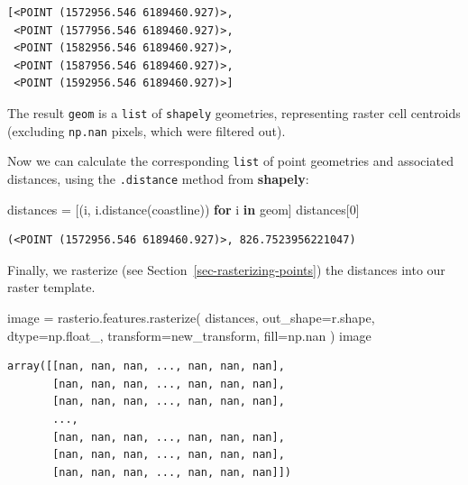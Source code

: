 \documentclass[
  letterpaper,
]{krantz}
\newenvironment{Shaded}{\begin{snugshade}}{\end{snugshade}}
\newcommand{\ControlFlowTok}[1]{\textcolor[rgb]{0.00,0.23,0.31}{\textbf{#1}}}
\newcommand{\DecValTok}[1]{\textcolor[rgb]{0.68,0.00,0.00}{#1}}
\newcommand{\KeywordTok}[1]{\textcolor[rgb]{0.00,0.23,0.31}{\textbf{#1}}}
\newcommand{\NormalTok}[1]{\textcolor[rgb]{0.00,0.23,0.31}{#1}}
\newcommand{\OperatorTok}[1]{\textcolor[rgb]{0.37,0.37,0.37}{#1}}
\begin{document}
\begin{verbatim}
[<POINT (1572956.546 6189460.927)>,
 <POINT (1577956.546 6189460.927)>,
 <POINT (1582956.546 6189460.927)>,
 <POINT (1587956.546 6189460.927)>,
 <POINT (1592956.546 6189460.927)>]
\end{verbatim}

The result \texttt{geom} is a \texttt{list} of \texttt{shapely}
geometries, representing raster cell centroids (excluding
\texttt{np.nan} pixels, which were filtered out).

Now we can calculate the corresponding \texttt{list} of point geometries
and associated distances, using the \texttt{.distance} method from
\textbf{shapely}:

\begin{Shaded}
\begin{Highlighting}[]
\NormalTok{distances }\OperatorTok{=}\NormalTok{ [(i, i.distance(coastline)) }\ControlFlowTok{for}\NormalTok{ i }\KeywordTok{in}\NormalTok{ geom]}
\NormalTok{distances[}\DecValTok{0}\NormalTok{]}
\end{Highlighting}
\end{Shaded}

\begin{verbatim}
(<POINT (1572956.546 6189460.927)>, 826.7523956221047)
\end{verbatim}

Finally, we rasterize (see Section~\ref{sec-rasterizing-points}) the
distances into our raster template.

\begin{Shaded}
\begin{Highlighting}[]
\NormalTok{image }\OperatorTok{=}\NormalTok{ rasterio.features.rasterize(}
\NormalTok{    distances,}
\NormalTok{    out\_shape}\OperatorTok{=}\NormalTok{r.shape,}
\NormalTok{    dtype}\OperatorTok{=}\NormalTok{np.float\_,}
\NormalTok{    transform}\OperatorTok{=}\NormalTok{new\_transform,}
\NormalTok{    fill}\OperatorTok{=}\NormalTok{np.nan}
\NormalTok{)}
\NormalTok{image}
\end{Highlighting}
\end{Shaded}

\begin{verbatim}
array([[nan, nan, nan, ..., nan, nan, nan],
       [nan, nan, nan, ..., nan, nan, nan],
       [nan, nan, nan, ..., nan, nan, nan],
       ...,
       [nan, nan, nan, ..., nan, nan, nan],
       [nan, nan, nan, ..., nan, nan, nan],
       [nan, nan, nan, ..., nan, nan, nan]])
\end{verbatim}
\end{document}
